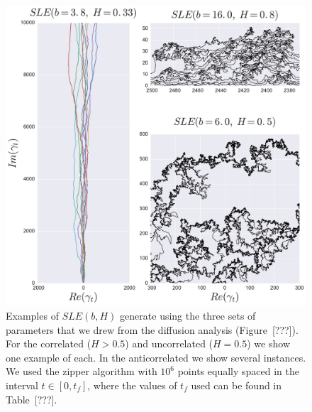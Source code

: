 \begin{figure}
\begin{center}
    \includegraphics[scale=0.5]{chapters/ch6-asle/figs/asle_traces}
\end{center}
\caption{Examples of $SLE(b,H)$ generate using the three sets of parameters
    that we drew from the diffusion analysis (Figure~[???]). For the correlated
    ($H>0.5$) and uncorrelated ($H=0.5$) we show one example of each. In the
    anticorrelated we show several instances. We used the zipper algorithm with
    $10^6$ points equally spaced in the interval $t\in[0, t_f]$, where the
    values of $t_f$ used can be found in Table~[???].}
\label{fig:asle_traces}
\end{figure}

